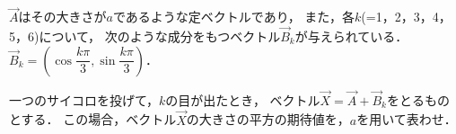 \documentclass[../../main.tex]{subfiles}
\begin{document}
$\vec{A}$はその大きさが$a$であるような定ベクトルであり，
また，各$k$(=1，2，3，4，5，6)について，
次のような成分をもつベクトル$\vec{B}_k$が与えられている．
$\displaystyle \vec{B}_k = \left( \cos\dfrac{k\pi}{3},\sin\dfrac{k\pi}{3} \right)$．

一つのサイコロを投げて，$k$の目が出たとき，
ベクトル$\vec{X}=\vec{A}+\vec{B}_k$をとるものとする．
この場合，ベクトル$\vec{X}$の大きさの平方の期待値を，$a$を用いて表わせ．
\end{document}
